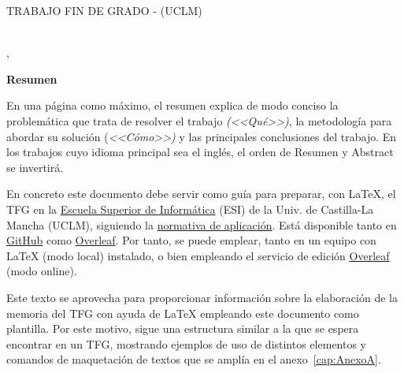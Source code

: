 \pagestyle{plain}	%
\makeatletter
\begin{center} %
   {\textsc{TRABAJO FIN DE GRADO - \@centroEdu{}
   (UCLM)}\par} %
   \vspace{1cm} %
   {\textbf{\Large\@tituloCorto}\par}  %
   \vspace{0.4cm} %
   {\@autor \\ \@cityTF,{} \@mesTF{} \@yearTF\par} 
   \vspace{0.9cm} %
   {\textbf{\large\textsf{Resumen}}\par} %
\end{center}   
\makeatother %
En una página como máximo, el resumen explica de modo conciso la problemática que trata de resolver el trabajo \emph{(<<Qué>>)}, la metodología para  abordar su solución (\emph{<<Cómo>>)} y las principales conclusiones del trabajo. En los trabajos cuyo idioma principal sea el inglés, el orden de \textsf{Resumen} y \textsf{Abstract} se invertirá. 

En concreto este documento debe servir como guía para preparar, con \LaTeX, el TFG en la \href{http://webpub.esi.uclm.es/}{Escuela Superior de Informática} (ESI) de la Univ. de Castilla-La Mancha (UCLM), siguiendo la \href{https://pruebasaluuclm.sharepoint.com/sites/esicr/tfg/SitePages/Inicio.aspx}{normativa de aplicación}. Está disponible tanto en \href{https://github.com/JesusSalido/TFG_ESI_UCLM}{GitHub} como \href{https://www.overleaf.com/latex/templates/plantilla-de-tfg-escuela-superior-de-informatica-uclm/phjgscmfqtsw}{Overleaf}. Por tanto, se puede emplear, tanto en un equipo con \LaTeX{} (modo local) instalado, o bien empleando el servicio de edición \href{https://www.overleaf.com/latex/templates/plantilla-de-tfg-escuela-superior-de-informatica-uclm/phjgscmfqtsw}{Overleaf} (modo online).

Este texto se aprovecha para proporcionar información sobre la elaboración de la memoria del TFG con ayuda de \LaTeX{} empleando este documento como plantilla. Por este motivo, sigue una estructura similar a la que se espera encontrar en un TFG, mostrando ejemplos de uso de distintos elementos y comandos de maquetación de textos que se amplía en el anexo~\ref{cap:AnexoA}.

